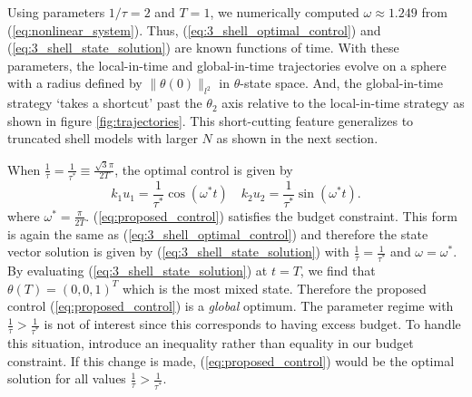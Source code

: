 Using parameters $1/\tau = 2$ and $T=1$, we numerically computed $\omega \approx 1.249$ from (\ref{eq:nonlinear_system}). Thus, (\ref{eq:3_shell_optimal_control}) and (\ref{eq:3_shell_state_solution}) are known functions of time. With these parameters, the local-in-time and global-in-time trajectories evolve on a sphere with a radius defined by $\|\theta(0)\|_{l^{2}}$ in $\theta$-state space. And, the global-in-time strategy `takes a shortcut' past the $\theta_{2}$ axis relative to the local-in-time strategy as shown in figure \ref{fig:trajectories}. This short-cutting feature generalizes to truncated shell models with larger $N$ as shown in the next section.

When $ \frac{1}{\tau} =\frac{1}{\tau^{*}}\equiv\frac{\sqrt{3}\pi }{2T} $, the optimal control is given by
\begin{equation}
	\label{eq:proposed_control}
	k_{1}u_{1}=\frac{1}{\tau^{*}}\cos(\omega^{*} t) \quad
	k_{2}u_{2}=\frac{1}{\tau^{*}}\sin(\omega^{*} t).
\end{equation}
where  $\omega^{*}=\frac{\pi}{2T}$. (\ref{eq:proposed_control}) satisfies the budget constraint. This form is again the same as (\ref{eq:3_shell_optimal_control}) and therefore the state vector solution is given by (\ref{eq:3_shell_state_solution}) with $\frac{1}{\tau}=\frac{1}{\tau^{*}}$ and $\omega =\omega^{*}$. By evaluating (\ref{eq:3_shell_state_solution}) at $t=T$, we find that $\theta(T) = (0, 0, 1)^{T}$ which is the most mixed state. Therefore the proposed control (\ref{eq:proposed_control}) is a {\it global } optimum. The parameter regime with $\frac{1}{\tau}> \frac{1}{\tau^{*}}$ is not of interest since this corresponds to having excess budget. To handle this situation, introduce an inequality rather than equality in our budget constraint. If this change is made, (\ref{eq:proposed_control}) would be the optimal solution for all values $\frac{1}{\tau}> \frac{1}{\tau^{*}}$.

